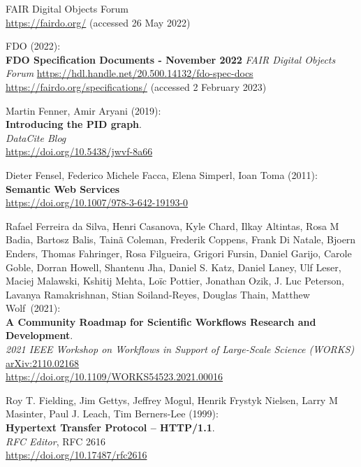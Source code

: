 \begin{thebibliography}{9}
{FAIR Digital Objects Forum} \\
\url{https://fairdo.org/} (accessed 26 May 2022)

FDO (2022): \\
\textbf{{FDO Specification Documents - November 2022}}
\emph{FAIR Digital Objects Forum}
\url{https://hdl.handle.net/20.500.14132/fdo-spec-docs}\\
\url{https://fairdo.org/specifications/} 
(accessed 2 February 2023) 

Martin Fenner, Amir Aryani (2019): \\
\textbf{Introducing the PID graph}. \\
\emph{DataCite Blog}\\
\url{https://doi.org/10.5438/jwvf-8a66}

Dieter Fensel, Federico Michele Facca, Elena Simperl, Ioan Toma
(2011): \\
\textbf{Semantic {Web Services}}\\
\url{https://doi.org/10.1007/978-3-642-19193-0}

Rafael Ferreira da Silva, Henri Casanova, Kyle Chard, Ilkay
Altintas, Rosa M Badia, Bartosz Balis, Tainã Coleman, Frederik Coppens,
Frank Di Natale, Bjoern Enders, Thomas Fahringer, Rosa Filgueira,
Grigori Fursin, Daniel Garijo, Carole Goble, Dorran Howell, Shantenu
Jha, Daniel S. Katz, Daniel Laney, Ulf Leser, Maciej Malawski, Kshitij
Mehta, Loïc Pottier, Jonathan Ozik, J. Luc Peterson, Lavanya
Ramakrishnan, Stian Soiland-Reyes, Douglas Thain, Matthew Wolf~(2021):\\
\textbf{A Community Roadmap for Scientific Workflows Research and
Development}.\\
\emph{2021 IEEE Workshop on Workflows in Support of Large-Scale Science (WORKS)}\\
\href{https://arxiv.org/abs/2110.02168}{arXiv:2110.02168}\\
\url{https://doi.org/10.1109/WORKS54523.2021.00016}

Roy T. Fielding, Jim Gettys, Jeffrey Mogul, Henrik Frystyk Nielsen, Larry M Masinter, Paul J. Leach, Tim Berners-Lee (1999):\\
\textbf{Hypertext Transfer Protocol -- HTTP/1.1}.\\
\emph{RFC Editor}, RFC 2616\\
\url{https://doi.org/10.17487/rfc2616}



\end{thebibliography}
